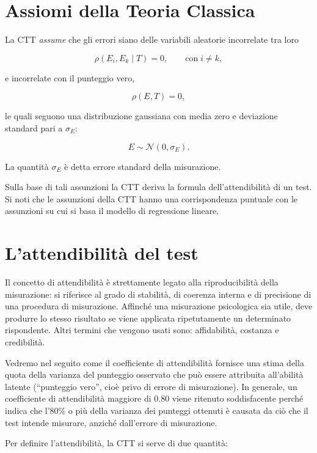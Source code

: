 \documentclass[
  11pt,
]{krantz}
\theoremstyle{definition}
\theoremstyle{definition}
\theoremstyle{definition}
\theoremstyle{definition}
\theoremstyle{remark}
\begin{document}
\hypertarget{assiomi-della-teoria-classica}{%
\section{Assiomi della Teoria Classica}\label{assiomi-della-teoria-classica}}

La CTT \emph{assume} che gli errori siano delle variabili aleatorie incorrelate tra loro

\[
\rho(E_i, E_k \mid T) = 0, \qquad\text{con}\; i \neq k,
\]

e incorrelate con il punteggio vero,

\[
\rho(E, T) = 0,
\]

le quali seguono una distribuzione gaussiana con media zero e deviazione standard pari a \(\sigma_E\):

\[
E \sim \mathcal{N}(0, \sigma_E).
\]

La quantità \(\sigma_E\) è detta errore standard della misurazione.

Sulla base di tali assunzioni la CTT deriva la formula dell'attendibilità di un test. Si noti che le assunzioni della CTT hanno una corrispondenza puntuale con le assunzioni su cui si basa il modello di regressione lineare.

\hypertarget{lattendibilituxe0-del-test}{%
\section{L'attendibilità del test}\label{lattendibilituxe0-del-test}}

Il concetto di attendibilità è strettamente legato alla riproducibilità della misurazione: si riferisce al grado di stabilità, di coerenza interna e di precisione di una procedura di misurazione. Affinché una misurazione psicologica sia utile, deve produrre lo stesso risultato se viene applicata ripetutamente un determinato rispondente. Altri termini che vengono usati sono: affidabilità, costanza e credibilità.

Vedremo nel seguito come il coefficiente di attendibilità fornisce una stima della quota della varianza del punteggio osservato che può essere attribuita all'abilità latente (``punteggio vero'', cioè privo di errore di misurazione). In generale, un coefficiente di attendibilità maggiore di 0.80 viene ritenuto soddisfacente perché indica che l'80\% o più della varianza dei punteggi ottenuti è causata da ciò che il test intende misurare, anziché dall'errore di misurazione.

Per definire l'attendibilità, la CTT si serve di due quantità:
\end{document}
